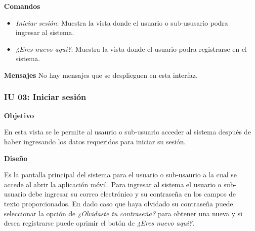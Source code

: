  \textbf{Comandos}
    \begin{itemize}
      \item \textit{Iniciar sesión}: Muestra la vista \textbf{} donde el usuario o sub-ususario podra ingresar al sistema.
      \item \textit{¿Eres nuevo aquí?}: Muestra la vista \textbf{} donde el usuario podra registrarse en el sistema.
    \end{itemize}
\textbf{Mensajes} No hay mensajes que se desplieguen en esta interfaz.
  
\subsubsection{IU 03: Iniciar sesión} \label{iu03}
  \textbf{Objetivo} \par
  En esta vista se le permite al usaurio o sub-usuario acceder al sistema después de haber ingresando los datos requeridos para iniciar su sesión. \par
  \textbf{Diseño} \par
  Es la pantalla principal del sistema para el usuario o sub-usaurio a la cual se accede al abrir la aplicación móvil. Para ingresar al sistema el usuario o sub-usuario debe ingresar su correo electrónico y su contraseña en los campos de texto proporcionados. En dado caso que haya olvidado su contraseña puede seleccionar la opción de \textit{¿Olvidaste tu contraseña?} para obtener una nueva y si desea registrarse puede oprimir el botón de \textit{¿Eres nuevo aqui?}.
